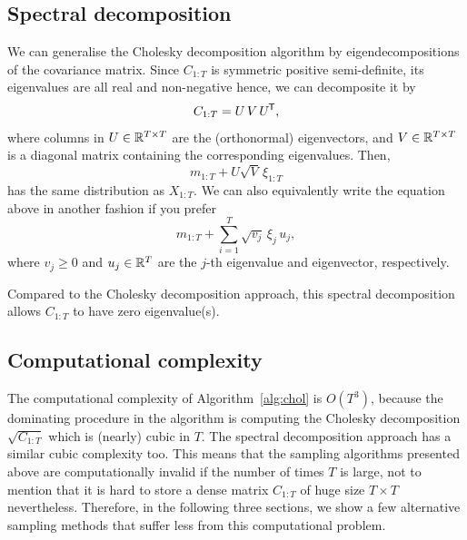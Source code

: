 \documentclass[]{article}
\begin{document}
\subsection{Spectral decomposition}
\label{equ:eigendecomposition}
We can generalise the Cholesky decomposition algorithm by eigendecompositions of the covariance matrix. Since $C_{1:T}$ is symmetric positive semi-definite, its eigenvalues are all real and non-negative hence, we can decomposite it by 
%
\begin{equation*}
	C_{1:T} = U \, V \, U^{\mkern-1.5mu\mathsf{T}}, 
\end{equation*}
%
where columns in $U \in\mathbb{R}^{T\times T}$ are the (orthonormal) eigenvectors, and $V\in\mathbb{R}^{T\times T}$ is a diagonal matrix containing the corresponding eigenvalues. Then,
%
\begin{equation*}
	m_{1:T} + U \sqrt{V} \, \xi_{1:T}
\end{equation*}
%
has the same distribution as $X_{1:T}$. We can also equivalently write the equation above in another fashion if you prefer
%
\begin{equation*}
	m_{1:T} + \sum^T_{i=1} \sqrt{v_j} \, \xi_j \, u_j,
\end{equation*}
%
where $v_j \geq 0$ and $u_j \in\mathbb{R}^{T}$ are the $j$-th eigenvalue and eigenvector, respectively.

Compared to the Cholesky decomposition approach, this spectral decomposition allows $C_{1:T}$ to have zero eigenvalue(s).  

\subsection{Computational complexity}
The computational complexity of Algorithm~\ref{alg:chol} is $O(T^3)$, because the dominating procedure in the algorithm is computing the Cholesky decomposition $\sqrt{C_{1:T}}$ which is (nearly) cubic in $T$. The spectral decomposition approach has a similar cubic complexity too. This means that the sampling algorithms presented above are computationally invalid if the number of times $T$ is large, not to mention that it is hard to store a dense matrix $C_{1:T}$ of huge size $T\times T$ nevertheless. Therefore, in the following three sections, we show a few alternative sampling methods that suffer less from this computational problem.
\end{document}
